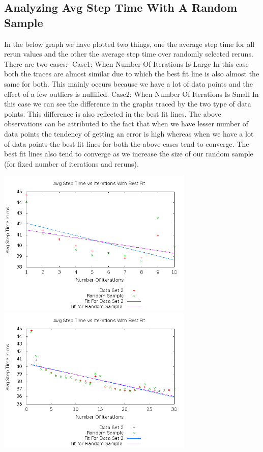 \documentclass[11pt]{article}
\begin{document}
	\subsection{Analyzing Avg Step Time With A Random Sample}
	In the below graph we have plotted two things, one the average step time for all rerun values and the other the average step time over randomly selected reruns. There are two cases:-\newline
	Case1: When Number Of Iterations Is Large\newline
	In this case both the traces are almost similar due to which the best fit line is also almost the same for both. This mainly occurs because we have a lot of data points and the effect of a few outliers is nullified.\newline
	Case2: When Number Of Iterations Is Small\newline
	In this case we can see the difference in the graphs traced by the two type of data points. This difference is also reflected in the best fit lines.\newline
The above observations can be attributed to the fact that when we have lesser number of data points the tendency of getting an error is high whereas when we have a lot of data points the best fit lines for both the above cases tend to converge. The best fit lines also tend to converge as we increase the size of our random sample (for fixed number of iterations and reruns).
	
	\begin{center}\includegraphics[height=7cm]{10_10_plot05.png}\includegraphics[height=7cm]{30_60_plot05.png}\end{center}
\end{document}
